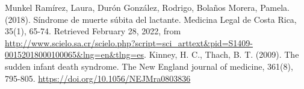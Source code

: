 
\begin{thebibliography}{00}
     Munkel Ramírez, Laura, Durón González, Rodrigo, Bolaños Morera, Pamela. (2018). Síndrome de muerte súbita del lactante. Medicina Legal de Costa Rica, 35(1), 65-74. Retrieved February 28, 2022, from \url{http://www.scielo.sa.cr/scielo.php?script=sci_arttext&pid=S1409-00152018000100065&lng=en&tlng=es}.
     Kinney, H. C., Thach, B. T. (2009). The sudden infant death syndrome. The New England journal of medicine, 361(8), 795-805. \url{https://doi.org/10.1056/NEJMra0803836}
\end{thebibliography}
  
\printglossary[type=\acronymtype]